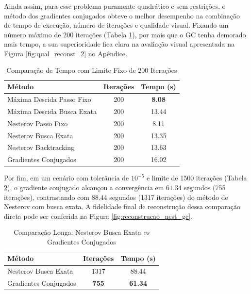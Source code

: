 \documentclass[12pt]{article}
\begin{document}
Ainda assim, para esse problema puramente quadrático e sem restrições, o método dos gradientes conjugados obteve o melhor desempenho na combinação de tempo de execução, número de iterações e qualidade visual. Fixando um número máximo de 200 iterações (Tabela \ref{tab:resultados_2}), por mais que o GC tenha demorado mais tempo, a sua superioridade fica clara na avaliação visual apresentada na Figura \ref{fig:qual_reconst_2} no Apêndice.

\begin{table}[H]
    \centering
    \caption{Comparação de Tempo com Limite Fixo de 200 Iterações}
    \label{tab:resultados_2}
    \begin{tabular}{lcc}
        \toprule
        \textbf{Método} & \textbf{Iterações} & \textbf{Tempo (s)} \\
        \midrule
        Máxima Descida Passo Fixo & 200 & \textbf{8.08} \\
        Máxima Descida Busca Exata & 200 & 13.44 \\
        Nesterov Passo Fixo & 200 & 8.11 \\
        Nesterov Busca Exata & 200 & 13.35 \\
        Nesterov Backtracking & 200 & 13.63 \\
        Gradientes Conjugados & 200 & 16.02 \\
        \bottomrule
    \end{tabular}
\end{table}

Por fim, em um cenário com tolerância de $10^{-5}$ e limite de 1500 iterações (Tabela \ref{tab:resultados_3}), o gradiente conjugado alcançou a convergência em $61.34$ segundos (755 iterações), contrastando com $88.44$ segundos (1317 iterações) do método de Nesterov com busca exata. A fidelidade final de reconstrução dessa comparação direta pode ser conferida na Figura \ref{fig:reconstrucao_nest_gc}.

\begin{table}[H]
    \centering
    \caption{Comparação Longa: Nesterov Busca Exata \textit{vs} Gradientes Conjugados}
    \label{tab:resultados_3}
    \begin{tabular}{lcc}
        \toprule
        \textbf{Método} & \textbf{Iterações} & \textbf{Tempo (s)} \\
        \midrule
        Nesterov Busca Exata & 1317 & 88.44 \\
        Gradientes Conjugados & \textbf{755} & \textbf{61.34} \\
        \bottomrule
    \end{tabular}
\end{table}
\end{document}
